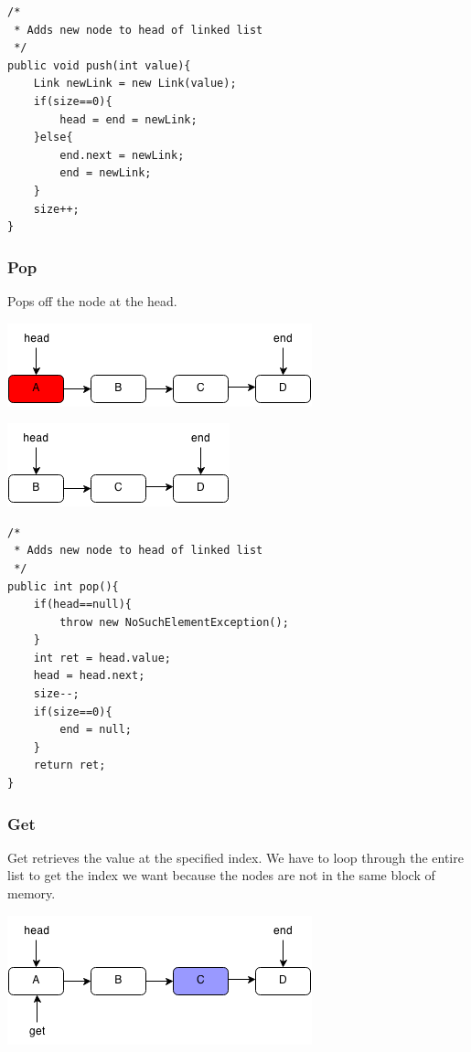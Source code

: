 \documentclass[11pt,oneside]{book}
\makeatletter
\def\maxwidth#1{\ifdim\Gin@nat@width>#1 #1\else\Gin@nat@width\fi}
\makeatother
\begin{document}
\begin{lstlisting}
/*
 * Adds new node to head of linked list
 */
public void push(int value){
    Link newLink = new Link(value);
    if(size==0){
        head = end = newLink;
    }else{
        end.next = newLink;
        end = newLink;
    }
    size++;
}
\end{lstlisting}

\subsubsection{Pop}

Pops off the node at the head.

\includegraphics[width=\maxwidth{\textwidth}]{linkedlistpop.png}

\includegraphics[width=\maxwidth{\textwidth}]{linkedlistpop2.png}

\begin{lstlisting}
/*
 * Adds new node to head of linked list
 */
public int pop(){
    if(head==null){
        throw new NoSuchElementException();
    }
    int ret = head.value;
    head = head.next;
    size--;
    if(size==0){
        end = null;
    }
    return ret;
}
\end{lstlisting}

\subsubsection{Get}

Get retrieves the value at the specified index. We have to loop through the entire list to get the index we want because the nodes are not in the same block of memory.

\includegraphics[width=\maxwidth{\textwidth}]{linkedlistget.png}
\end{document}
